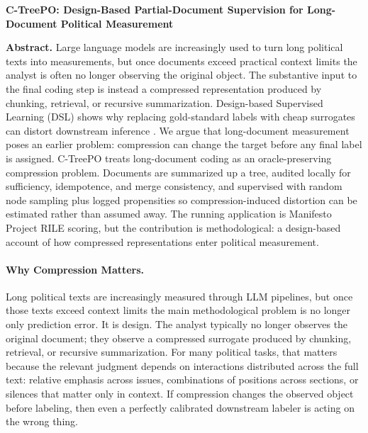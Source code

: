 \documentclass[11pt]{article}
\begin{document}
\begin{center}
{\Large \textbf{C-TreePO: Design-Based Partial-Document Supervision for Long-Document Political Measurement}\par}
\end{center}

\textbf{Abstract.} Large language models are increasingly used to turn long political texts into measurements, but once documents exceed practical context limits the analyst is often no longer observing the original object. The substantive input to the final coding step is instead a compressed representation produced by chunking, retrieval, or recursive summarization. Design-based Supervised Learning (DSL) shows why replacing gold-standard labels with cheap surrogates can distort downstream inference \citep{EgamiEtAl2024}. We argue that long-document measurement poses an earlier problem: compression can change the target before any final label is assigned. C-TreePO treats long-document coding as an oracle-preserving compression problem. Documents are summarized up a tree, audited locally for sufficiency, idempotence, and merge consistency, and supervised with random node sampling plus logged propensities so compression-induced distortion can be estimated rather than assumed away. The running application is Manifesto Project RILE scoring, but the contribution is methodological: a design-based account of how compressed representations enter political measurement.

\paragraph{Why Compression Matters.}
Long political texts are increasingly measured through LLM pipelines, but once those texts exceed context limits the main methodological problem is no longer only prediction error. It is design. The analyst typically no longer observes the original document; they observe a compressed surrogate produced by chunking, retrieval, or recursive summarization. For many political tasks, that matters because the relevant judgment depends on interactions distributed across the full text: relative emphasis across issues, combinations of positions across sections, or silences that matter only in context. If compression changes the observed object before labeling, then even a perfectly calibrated downstream labeler is acting on the wrong thing.
\end{document}
